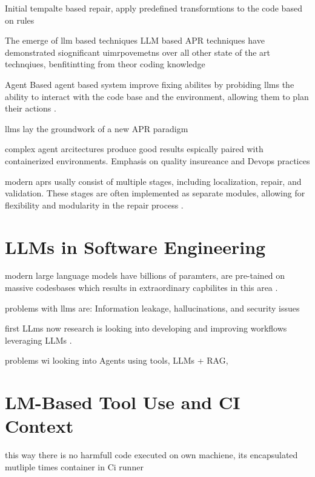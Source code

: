 Initial tempalte based repair,
apply predefined transformtions to the code based on rules

The emerge of llm based techniques
LLM based APR techniques have demonstrated siognificant uimrpovemetns over all other state of the art technqiues, benfitintting from theor coding knowledge \cite{hossainDeepDiveLarge2024}

Agent Based
agent based system improve fixing abilites by probiding llms the ability to interact with the code base and the environment, allowing them to plan their actions  \cite{yangSWEagentAgentComputerInterfaces2024}.

llms lay the groundwork of a new APR paradigm \cite{chenUnveilingPitfallsUnderstanding2025}

complex agent arcitectures produce good results espically paired with containerized environments. Emphasis on quality insureance and Devops practices \cite{puvvadiCodingAgentsComprehensive2025}


modern aprs usally consist of multiple stages, including localization, repair, and validation. These stages are often implemented as separate modules, allowing for flexibility and modularity in the repair process \cite{yangSWEagentAgentComputerInterfaces2024}.

\section{LLMs in Software Engineering}

modern large language models have billions of paramters, are pre-tained on massive codesbases which results in extraordinary capbilites in this area  \cite{chenUnveilingPitfallsUnderstanding2025}.

problems with llms are: Information leakage, hallucinations, and security issues

first LLms now research is looking into developing and improving workflows leveraging LLMs \cite{puvvadiCodingAgentsComprehensive2025}.

problems wi
looking into Agents using tools, LLMs + RAG,

\section{LM-Based Tool Use and CI Context}

this way there is no harmfull code executed on own machiene, its encapsulated mutliple times container in Ci runner


